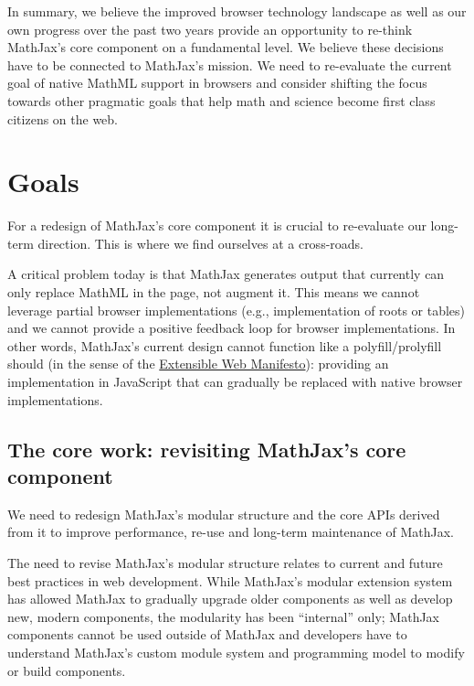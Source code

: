 \documentclass[]{amsart}
\begin{document}
In summary, we believe the improved browser technology landscape as well
as our own progress over the past two years provide an opportunity to
re-think MathJax's core component on a fundamental level. We believe
these decisions have to be connected to MathJax's mission. We need to
re-evaluate the current goal of native MathML support in browsers and
consider shifting the focus towards other pragmatic goals that help math
and science become first class citizens on the web.

\section{Goals}\label{goals}

For a redesign of MathJax's core component it is crucial to re-evaluate
our long-term direction. This is where we find ourselves at a
cross-roads.

A critical problem today is that MathJax generates output that currently
can only replace MathML in the page, not augment it. This means we
cannot leverage partial browser implementations (e.g., implementation of
roots or tables) and we cannot provide a positive feedback loop for
browser implementations. In other words, MathJax's current design cannot
function like a polyfill/prolyfill should (in the sense of the
\href{https://extensiblewebmanifesto.org/}{Extensible Web Manifesto}):
providing an implementation in JavaScript that can gradually be replaced
with native browser implementations.

\subsection{The core work: revisiting MathJax's core
component}\label{the-core-work-revisiting-mathjaxs-core-component}

We need to redesign MathJax's modular structure and the core APIs
derived from it to improve performance, re-use and long-term maintenance
of MathJax.

The need to revise MathJax's modular structure relates to current and
future best practices in web development. While MathJax's modular
extension system has allowed MathJax to gradually upgrade older
components as well as develop new, modern components, the modularity has
been ``internal'' only; MathJax components cannot be used outside of
MathJax and developers have to understand MathJax's custom module system
and programming model to modify or build components.
\end{document}
